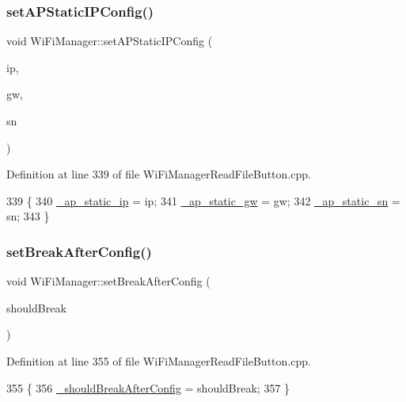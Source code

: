 \subsubsection{\texorpdfstring{set\+A\+P\+Static\+I\+P\+Config()}{setAPStaticIPConfig()}}
{\footnotesize\ttfamily void Wi\+Fi\+Manager\+::set\+A\+P\+Static\+I\+P\+Config (\begin{DoxyParamCaption}\item[{I\+P\+Address}]{ip,  }\item[{I\+P\+Address}]{gw,  }\item[{I\+P\+Address}]{sn }\end{DoxyParamCaption})}



Definition at line 339 of file Wi\+Fi\+Manager\+Read\+File\+Button.\+cpp.


\begin{DoxyCode}
339                                                                               \{
340   \hyperlink{class_wi_fi_manager_ae81b413e85811506099ba6eab48e1006}{\_ap\_static\_ip} = ip;
341   \hyperlink{class_wi_fi_manager_a5ab87bab28f0dc3c865912b4bb303992}{\_ap\_static\_gw} = gw;
342   \hyperlink{class_wi_fi_manager_a8122027aecd1a1dd9b60f21e87286808}{\_ap\_static\_sn} = sn;
343 \}
\end{DoxyCode}
\mbox{\label{class_wi_fi_manager_ad48fd74c893d12778121fa239d245cc9}} 
\subsubsection{\texorpdfstring{set\+Break\+After\+Config()}{setBreakAfterConfig()}}
{\footnotesize\ttfamily void Wi\+Fi\+Manager\+::set\+Break\+After\+Config (\begin{DoxyParamCaption}\item[{boolean}]{should\+Break }\end{DoxyParamCaption})}



Definition at line 355 of file Wi\+Fi\+Manager\+Read\+File\+Button.\+cpp.


\begin{DoxyCode}
355                                                          \{
356   \hyperlink{class_wi_fi_manager_adf42bd3bb7ac538e97407f66e5170858}{\_shouldBreakAfterConfig} = shouldBreak;
357 \}
\end{DoxyCode}
\mbox{\label{class_wi_fi_manager_a904006cb4d2c769e93bfdef336853766}} 

